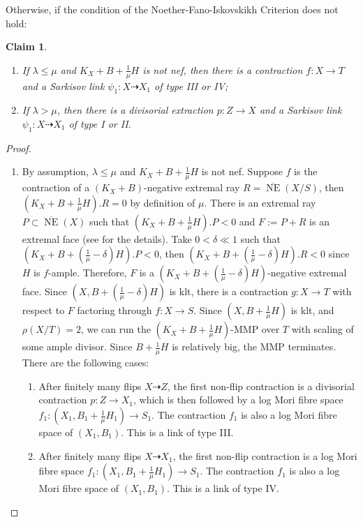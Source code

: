 \documentclass[11pt]{amsart}
\newtheorem{claim}[defn]{Claim}
\begin{document}
Otherwise, if the condition of the Noether-Fano-Iskovskikh Criterion does not hold:
\begin{claim}
  \begin{enumerate}
    \item If $ \lambda\leqslant\mu $ and $ K_X+B+\frac{1}{\mu}H $ is not nef, then there is a contraction $f:X \to T$ and a Sarkisov link $\psi_{1}:X\dashrightarrow X_{1}$ of type III or IV;
    \item  If $ \lambda>\mu $, then there is a divisorial extraction $p:Z\to X$ and a Sarkisov link $ \psi_{1}:X\dashrightarrow X_{1}$ of type I or II.
  \end{enumerate}
\end{claim}
\begin{proof}
  \begin{enumerate}
    \item\label{a} By assumption,  $\lambda\leqslant \mu$ and   $ K_X+B+\frac{1}{\mu}H $ is not nef. Suppose $ f $ is the contraction of a $ (K_X+B) $-negative extremal ray $ R= \overline{\operatorname{ NE }}(X/S) $, then $ (K_X+B+\frac{1}{\mu}H).R=0 $ by definition of $ \mu $. There is an extremal ray $ P \subset \overline{\operatorname{ NE }}(X) $ such that $ (K_X+B+\frac{1}{\mu}H).P<0 $ and $ F:=P+R $ is an extremal face  (see \cite[5.4.2]{cortiFactoringBirationalMaps} for the details). Take  $ 0<\delta\ll 1 $ such that $ (K_X+B+(\frac{1}{\mu}-\delta)H).P<0 $, then $  (K_X+B+(\frac{1}{\mu}-\delta)H).R<0 $ since $H$ is $f$-ample. Therefore, $ F $ is a $  (K_X+B+(\frac{1}{\mu}-\delta)H) $-negative extremal face. Since $ (X,B+(\frac{1}{\mu}-\delta)H) $ is klt, there is  a contraction $ g:X\to T $ with respect to $F$ factoring through $ f:X\to S $. Since  $ (X,B+\frac{1}{\mu}H) $ is klt, and $ \rho(X/T)=2 $,  we can  run the  $ (K_X+B+\frac{1}{\mu}H) $-MMP over $T$ with scaling of some ample divisor.  Since $ B+\frac{1}{\mu}H $ is relatively big,  the MMP terminates. There are the following cases:
    \begin{enumerate}
      \item\label{a1}
      After finitely many flips $ X\dashrightarrow Z $, the first non-flip contraction is a divisorial contraction $ p:Z\to X_1 $, which is then followed by a log Mori fibre space $f_{1}:(X_{1},B_{1}+\frac{1}{\mu}H_{1})\to S_1$. The contraction $f_1$ is also a log Mori fibre space of $(X_{1},B_{1})$.
      This is a link of type III.
      \item\label{a2}
      After finitely many flips $ X\dashrightarrow X_1 $, the first non-flip contraction is a log Mori fibre space $ f_1:(X_1,B_1+\frac{1}{\mu}H_1)\to S_{1} $. The contraction $f_1$ is also a log Mori fibre space of $(X_{1},B_{1})$. This is a link of type IV.

\end{enumerate}
\end{enumerate}
\end{proof}
\end{document}
